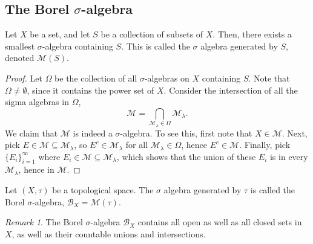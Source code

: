 \documentclass[11pt]{article}
\newcommand{\M}{\mathcal{M}}
\theoremstyle{definition}
\theoremstyle{remark}
\newtheorem*{remark}{Remark}
\numberwithin{equation}{section}
\begin{document}
    \subsection{The Borel $\sigma$-algebra}

    \begin{theorem}
        Let $X$ be a set, and let $S$ be a collection of subsets of $X$. Then, there
        exists a smallest $\sigma$-algebra containing $S$. This is called the
        $\sigma$ algebra generated by $S$, denoted $\M(S)$.
    \end{theorem}
    \begin{proof}
        Let $\Omega$ be the collection of all $\sigma$-algebras on $X$ containing
        $S$. Note that $\Omega \neq \emptyset$, since it contains the power set of
        $X$. Consider the intersection of all the sigma algebras in $\Omega$, \[
            \M = \bigcap_{\M_\lambda \in \Omega} \M_\lambda.
        \] We claim that $\M$ is indeed a $\sigma$-algebra. To see this, first note
        that $X \in \M$. Next, pick $E \in \M \subseteq \M_\lambda$, so $E^c \in
        \M_\lambda$ for all $\M_\lambda \in \Omega$, hence $E^c \in \M$. Finally,
        pick $\{E_i\}_{i = 1}^\infty$ where $E_i \in \M \subseteq \M_\lambda$, which
        shows that the union of these $E_i$ is in every $\M_\lambda$, hence in $\M$.
    \end{proof}

    \begin{definition}
        Let $(X, \tau)$ be a topological space. The $\sigma$ algebra generated by
        $\tau$ is called the Borel $\sigma$-algebra, $\mathcal{B}_X = \M(\tau)$.
        \begin{remark}
            The Borel $\sigma$-algebra $\mathcal{B}_X$ contains all open as well as
            all closed sets in $X$, as well as their countable unions and
            intersections.
        \end{remark}
    \end{definition}
\end{document}
